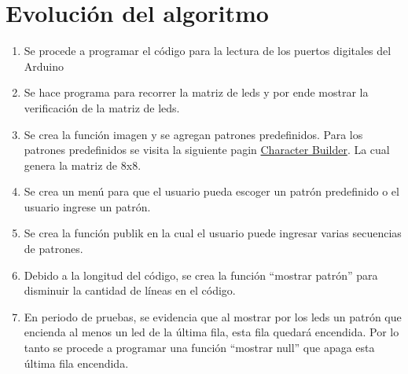 \documentclass{article}
\begin{document}
\section{Evolución del algoritmo}
\begin{enumerate}
    \item 
    Se procede a programar el código para la lectura de los puertos digitales del Arduino
    \item
    Se hace programa para recorrer la matriz de leds y por ende mostrar la verificación de la matriz de leds.
    \item
    Se crea la función imagen y se agregan patrones predefinidos. Para los patrones predefinidos se visita la siguiente pagin \href{https://rodrigosc.github.io/ArduinoLedMatrix/char_builder/builder.html}{Character Builder}. La cual genera la matriz de 8x8.
    \item
    Se crea un menú para que el usuario pueda escoger un patrón predefinido o el usuario ingrese un patrón.
    \item
    Se crea la función publik en la cual el usuario puede ingresar varias secuencias de patrones.
    \item
    Debido a la longitud del código, se crea la función “mostrar patrón” para disminuir la cantidad de líneas en el código.
    \item
    En periodo de pruebas, se evidencia que al mostrar por los leds un patrón que encienda al menos un led de la última fila, esta fila quedará encendida. Por lo tanto se procede a programar una función “mostrar null” que apaga esta última fila encendida.
    
\end{enumerate}
\end{document}
